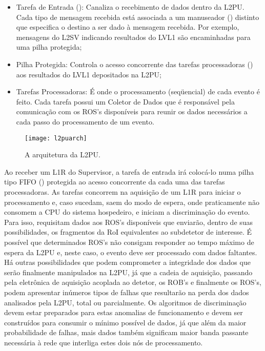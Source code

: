 \begin{itemize}
\item Tarefa de Entrada (): Canaliza o recebimento de dados
dentro da L2PU. Cada tipo de mensagem recebida está associada a um manuseador
() distinto que especifica o destino a ser dado à mensagem
recebida. Por exemplo, mensagens do L2SV indicando resultados do LVL1 são
encaminhadas para uma pilha protegida;

\item Pilha Protegida: Controla o acesso concorrente das tarefas processadoras
() aos resultados do LVL1 depositados na L2PU;

\item Tarefas Processadoras: É onde o processamento (seqüencial) de cada
evento é feito. Cada tarefa possui um Coletor de Dados que é responsável pela
comunicação com os ROS's disponíveis para reunir os dados necessários a cada
passo do processamento de um evento.
\end{itemize}

\begin{figure}
\begin{center}
\texttt{[image: l2puarch]}
\end{center}
\caption{A arquitetura da L2PU.}
\label{fig:l2puarch}
\end{figure}

Ao receber um L1R do Supervisor, a tarefa de entrada irá colocá-lo numa pilha
tipo FIFO () protegida ao acesso concorrente da cada
uma das tarefas processadoras. As tarefas concorrem na aquisição de um L1R
para iniciar o processamento e, caso sucedam, saem do modo de espera, onde
praticamente não consomem a CPU do sistema hospedeiro, e iniciam a
discriminação do evento. Para isso, requisitam dados aos ROS's disponíveis que
enviarão, dentro de suas possibilidades, os fragmentos da RoI equivalentes ao
subdetetor de interesse. É possível que determinados ROS's não consigam
responder ao tempo máximo de espera da L2PU e, neste caso, o evento deve ser
processado com dados faltantes. Há outras possibilidades que podem comprometer
a integridade dos dados que serão finalmente manipulados na L2PU, já que a
cadeia de aquisição, passando pela eletrônica de aquisição acoplada ao
detetor, os ROB's e finalmente os ROS's, podem apresentar inúmeros tipos de
falhas que resultarão na perda dos dados analisados pela L2PU, total ou
parcialmente. Os algoritmos de discriminação devem estar preparados para estas
anomalias de funcionamento e devem ser construídos para consumir o mínimo
possível de dados, já que além da maior probabilidade de falhas, mais dados
também significam maior banda passante necessária à rede que interliga estes
dois nós de processamento.

